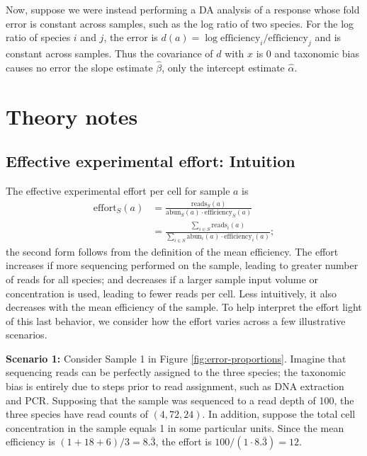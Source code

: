 \documentclass[
]{article}
\begin{document}
Now, suppose we were instead performing a DA analysis of a response whose fold error is constant across samples, such as the log ratio of two species.
For the log ratio of species \(i\) and \(j\), the error is \(d(a) = \log \text{efficiency}_i / \text{efficiency}_j\) and is constant across samples.
Thus the covariance of \(d\) with \(x\) is 0 and taxonomic bias causes no error the slope estimate \(\hat \beta\), only the intercept estimate \(\hat \alpha\).

\hypertarget{theory-notes}{%
\section{Theory notes}\label{theory-notes}}

\hypertarget{effective-experimental-effort-intuition}{%
\subsection{Effective experimental effort: Intuition}\label{effective-experimental-effort-intuition}}

The effective experimental effort per cell for sample \(a\) is
\begin{align}
  \label{eq:effort}
  \text{effort}_S(a)
    &= \frac{\text{reads}_S(a)}{\text{abun}_S(a) \cdot \text{efficiency}_S(a)} \\
    &= \frac{\sum_{i \in S}\text{reads}_i(a)}{\sum_{i \in S} \text{abun}_i(a) \cdot \text{efficiency}_i(a)};
\end{align}
the second form follows from the definition of the mean efficiency.
The effort increases if more sequencing performed on the sample, leading to greater number of reads for all species; and decreases if a larger sample input volume or concentration is used, leading to fewer reads per cell.
Less intuitively, it also decreases with the mean efficiency of the sample.
To help interpret the effort light of this last behavior, we consider how the effort varies across a few illustrative scenarios.

\textbf{Scenario 1:}
Consider Sample 1 in Figure \ref{fig:error-proportions}.
Imagine that sequencing reads can be perfectly assigned to the three species; the taxonomic bias is entirely due to steps prior to read assignment, such as DNA extraction and PCR.
Supposing that the sample was sequenced to a read depth of 100, the three species have read counts of \((4, 72, 24)\).
In addition, suppose the total cell concentration in the sample equals 1 in some particular units.
Since the mean efficiency is \((1 + 18 + 6) / 3 = 8.\bar 3\), the effort is \(100 / (1 \cdot 8.\bar 3) = 12\).
\end{document}
